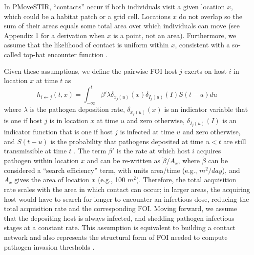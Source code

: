 \documentclass[letterpaper]{article}
\begin{document}
In PMoveSTIR, ``contacts'' occur if both individuals visit a given location $x$, which could be a habitat patch or a grid cell. 
Locations $x$ do not overlap so the sum of their areas equals some total area over which individuals can move (see Appendix 1 for a derivation when $x$ is a point, not an area). 
Furthermore, we assume that the likelihood of contact is uniform within $x$, consistent with a so-called top-hat encounter function \citep{Gurarie2013,Wilber2022}.

Given these assumptions, we define the pairwise FOI host $j$ exerts on host $i$ in location $x$ at time $t$ as \citep{Wilber2022}
\begin{equation}
    h_{i \leftarrow j}(t, x) = \int_{-\infty}^{t} \beta' \lambda \delta_{x_j(u)}(x) \delta_{I_j(u)}(I) S(t - u) du
    \label{eq:original_foi}
\end{equation}
where $\lambda$ is the pathogen deposition rate, $\delta_{x_j(u)}(x)$ is an indicator variable that is one if host $j$ is in location $x$ at time $u$ and zero otherwise, $\delta_{I_j(u)}(I)$ is an indicator function that is one if host $j$ is infected at time $u$ and zero otherwise, and $S(t-u)$ is the probability that  pathogens deposited at time $u < t$ are still transmissible at time $t$ \citep[see][for a full derivation]{Wilber2022}. 
The term $\beta'$ is the rate at which host $i$ acquires pathogen within location $x$ and can be re-written as $\tilde{\beta} / A_x$, where $\tilde{\beta}$ can be considered a ``search efficiency'' term, with units area/time (e.g., $m^2 / day$), and $A_x$ gives the area of location $x$ (e.g., 100 $m^2$). 
Therefore, the total acquisition rate scales with the area in which contact can occur; in larger areas, the acquiring host would have to search for longer to encounter an infectious dose, reducing the total acquisition rate and the corresponding FOI. Moving forward, we assume that the depositing host is always infected, and shedding pathogen infectious stages at a constant rate. This assumption is equivalent to building a contact network and also represents the structural form of FOI needed to compute pathogen invasion thresholds \citep{Wilber2022}.
\end{document}
